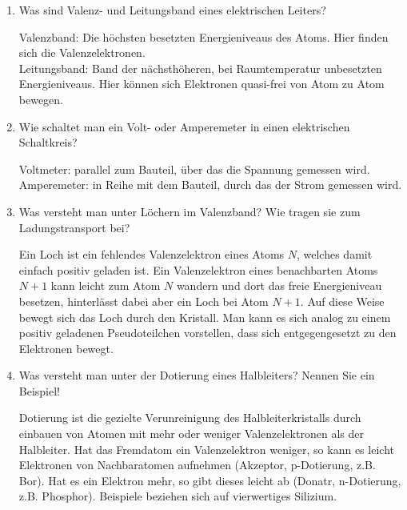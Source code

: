 \begin{tutorhint}
\begin{enumerate}
	\item Was sind Valenz- und Leitungsband eines elektrischen Leiters?
	\begin{solution}
		Valenzband: Die höchsten besetzten Energieniveaus des Atoms. Hier finden sich die Valenzelektronen.\\
		Leitungsband: Band der nächsthöheren, bei Raumtemperatur unbesetzten Energieniveaus. Hier können sich Elektronen quasi-frei von Atom zu Atom bewegen.
	\end{solution}
	\item Wie schaltet man ein Volt- oder Amperemeter in einen elektrischen Schaltkreis?
	\begin{solution}
		Voltmeter: parallel zum Bauteil, über das die Spannung gemessen wird.\\
		Amperemeter: in Reihe mit dem Bauteil, durch das der Strom gemessen wird.
	\end{solution}
	\item Was versteht man unter Löchern im Valenzband? Wie tragen sie zum Ladungstransport bei?
	\begin{solution}
		Ein Loch ist ein fehlendes Valenzelektron eines Atoms $N$, welches damit einfach positiv geladen ist. Ein Valenzelektron eines benachbarten Atoms $N+1$ kann leicht zum Atom $N$ wandern und dort das freie Energieniveau besetzen, hinterlässt dabei aber ein Loch bei Atom $N+1$. Auf diese Weise bewegt sich das Loch durch den Kristall. Man kann es sich analog zu einem positiv geladenen Pseudoteilchen vorstellen, dass sich entgegengesetzt zu den Elektronen bewegt. 
	\end{solution}
	\item Was versteht man unter der Dotierung eines Halbleiters? Nennen Sie ein Beispiel!
	\begin{solution}
		Dotierung ist die gezielte Verunreinigung des Halbleiterkristalls durch einbauen von Atomen mit mehr oder weniger Valenzelektronen als der Halbleiter. Hat das Fremdatom ein Valenzelektron weniger, so kann es leicht Elektronen von Nachbaratomen aufnehmen (Akzeptor, p-Dotierung, z.B. Bor). Hat es ein Elektron mehr, so gibt dieses leicht ab (Donatr, n-Dotierung, z.B. Phosphor). Beispiele beziehen sich auf vierwertiges Silizium.
	\end{solution}

\end{enumerate}
\end{tutorhint}
